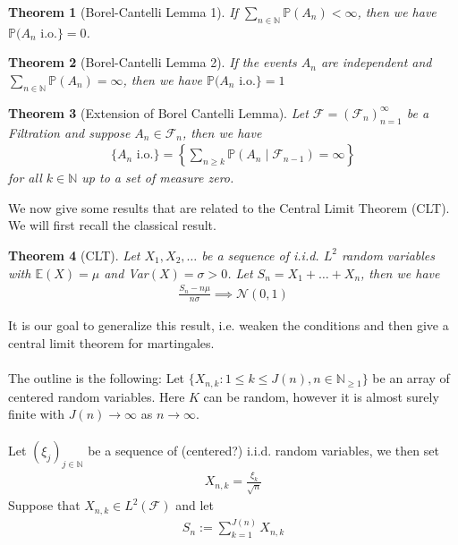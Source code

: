 \documentclass[11pt,a4paper, final]{article}
\newtheorem{thm}{Theorem}[section]
\theoremstyle{definition}
\begin{document}
\begin{thm}[Borel-Cantelli Lemma 1] If $\sum_{n \in \mathbb{N}} \mathbb{P}(A_n) < \infty$, then we have $\mathbb{P}(A_n \text{ i.o.} \rbrace=0$.
\end{thm}
\begin{thm}[Borel-Cantelli Lemma 2] If the events $A_n$ are independent and $\sum_{n \in \mathbb{N}} \mathbb{P}(A_n) = \infty$, then we have $\mathbb{P}( A_n \text{ i.o.} \rbrace = 1$ 
\end{thm}
\newpage
\begin{thm}[Extension of Borel Cantelli Lemma] Let $\mathcal{F}= (\mathcal{F}_n)_{n = 1}^\infty$ be a Filtration and suppose $A_n \in \mathcal{F}_n$, then we have
\begin{align*}
 \lbrace A_n \text{ i.o.}\rbrace = \left \lbrace \sum_{n \geq k} \mathbb{P}(A_n \mid \mathcal{F}_{n-1} ) = \infty \right \rbrace 
\end{align*}
for all $k \in \mathbb{N}$ up to a set of measure zero. 
\end{thm}
\noindent We now give some results that are related to the Central Limit Theorem (CLT). We will first recall the classical result.
\begin{thm}[CLT] Let $X_1, X_2, \dots$ be a sequence of i.i.d. $L^2$ random variables with $\mathbb{E}(X)= \mu$ and Var$(X)= \sigma >0$. Let $S_n= X_1 + \dots + X_n$, then we have
\begin{align*}
\frac{S_n-n \mu }{n \sigma} \implies \mathcal{N}(0,1) 
\end{align*}
\end{thm}
\noindent It is our goal to generalize this result, i.e. weaken the conditions and then give a central limit theorem for martingales. 
\\\\
The outline is the following: Let $\lbrace X_{n,k} : 1 \leq k \leq J(n), n \in \mathbb{N}_{ \geq 1 } \rbrace$ be an array of centered random variables. Here $K$ can be random, however it is almost surely finite with $J(n) \to \infty$ as $n \to \infty$.  
\\\\
Let $( \xi_j)_{j \in \mathbb{N}}$ be a sequence of (centered?) i.i.d. random variables, we then set 
\begin{align*}
X_{n,k} = \frac{\xi_k}{\sqrt{n}}
\end{align*}
Suppose that $X_{n,k} \in L^2( \mathcal{F})$ and let \begin{align*}
S_n := \sum_{k=1}^{J(n)} X_{n,k}
\end{align*}
\end{document}
